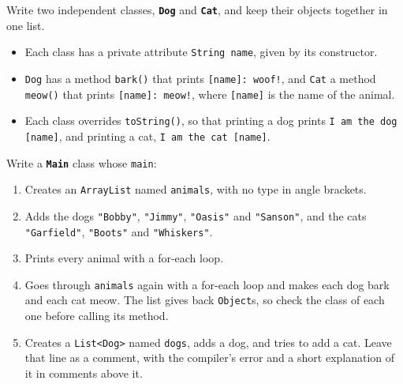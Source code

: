 Write two independent classes, \textbf{\texttt{Dog}} and \textbf{\texttt{Cat}}, and keep their objects together in one list.

\begin{itemize}

    \item Each class has a private attribute \texttt{String name}, given by its constructor.

    \item \texttt{Dog} has a method \texttt{bark()} that prints \texttt{[name]: woof!}, and \texttt{Cat} a method \texttt{meow()} that prints \texttt{[name]: meow!}, where \texttt{[name]} is the name of the animal.

    \item Each class overrides \texttt{toString()}, so that printing a dog prints \texttt{I am the dog [name]}, and printing a cat, \texttt{I am the cat [name]}.

\end{itemize}

Write a \textbf{\texttt{Main}} class whose \texttt{main}:

\begin{enumerate}

    \item Creates an \texttt{ArrayList} named \texttt{animals}, with no type in angle brackets.

    \item Adds the dogs \texttt{"Bobby"}, \texttt{"Jimmy"}, \texttt{"Oasis"} and \texttt{"Sanson"}, and the cats \texttt{"Garfield"}, \texttt{"Boots"} and \texttt{"Whiskers"}.

    \item Prints every animal with a for-each loop.

    \item Goes through \texttt{animals} again with a for-each loop and makes each dog bark and each cat meow. The list gives back \texttt{Object}s, so check the class of each one before calling its method.

    \item Creates a \texttt{List<Dog>} named \texttt{dogs}, adds a dog, and tries to add a cat. Leave that line as a comment, with the compiler's error and a short explanation of it in comments above it.

\end{enumerate}
